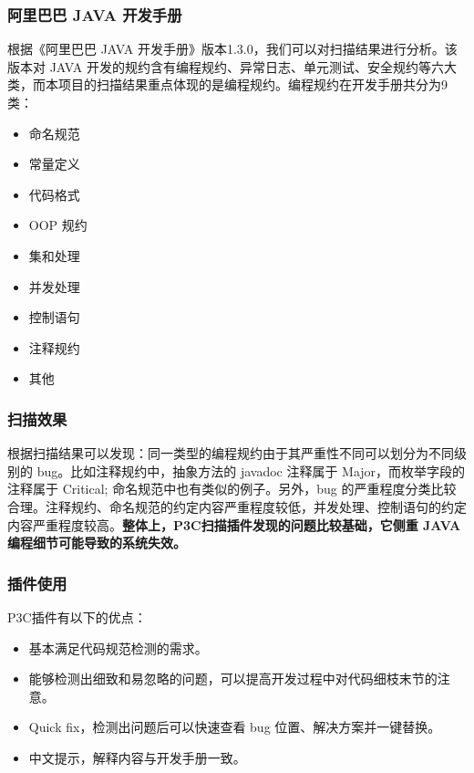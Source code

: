 \documentclass[hyperref, a4paper]{ctexart}
\providecommand{\tightlist}{%
  \setlength{\itemsep}{0pt}\setlength{\parskip}{0pt}}
\begin{document}
\hypertarget{ux963fux91ccux5df4ux5df4-java-ux5f00ux53d1ux624bux518c}{%
\subsubsection{阿里巴巴 JAVA
开发手册}\label{ux963fux91ccux5df4ux5df4-java-ux5f00ux53d1ux624bux518c}}

根据《阿里巴巴 JAVA
开发手册》版本1.3.0，我们可以对扫描结果进行分析。该版本对 JAVA
开发的规约含有编程规约、异常日志、单元测试、安全规约等六大类，而本项目的扫描结果重点体现的是编程规约。编程规约在开发手册共分为9类：

\begin{itemize}
\tightlist
\item
  命名规范
\item
  常量定义
\item
  代码格式
\item
  OOP 规约
\item
  集和处理
\item
  并发处理
\item
  控制语句
\item
  注释规约
\item
  其他
\end{itemize}

\hypertarget{ux626bux63cfux6548ux679c}{%
\subsubsection{扫描效果}\label{ux626bux63cfux6548ux679c}}

根据扫描结果可以发现：同一类型的编程规约由于其严重性不同可以划分为不同级别的
bug。比如注释规约中，抽象方法的 javadoc 注释属于
Major，而枚举字段的注释属于 Critical;
命名规范中也有类似的例子。另外，bug
的严重程度分类比较合理。注释规约、命名规范的约定内容严重程度较低，并发处理、控制语句的约定内容严重程度较高。\textbf{整体上，P3C扫描插件发现的问题比较基础，它侧重
JAVA 编程细节可能导致的系统失效。}

\hypertarget{ux63d2ux4ef6ux4f7fux7528}{%
\subsubsection{插件使用}\label{ux63d2ux4ef6ux4f7fux7528}}

P3C插件有以下的优点：

\begin{itemize}
\tightlist
\item
  基本满足代码规范检测的需求。
\item
  能够检测出细致和易忽略的问题，可以提高开发过程中对代码细枝末节的注意。
\item
  Quick fix，检测出问题后可以快速查看 bug 位置、解决方案并一键替换。
\item
  中文提示，解释内容与开发手册一致。
\end{itemize}
\end{document}
